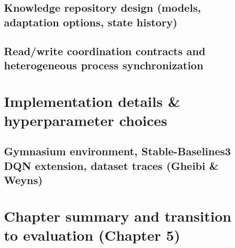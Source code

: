 \documentclass[11pt,a4paper]{article}
\begin{document}
\subsection{Knowledge repository design (models, adaptation options, state history)}
\subsection{Read/write coordination contracts and heterogeneous process synchronization}

\section{Implementation details \& hyperparameter choices}
\subsection{Gymnasium environment, Stable-Baselines3 DQN extension, dataset traces (Gheibi \& Weyns)}

\section{Chapter summary and transition to evaluation (Chapter 5)}
\end{document}

